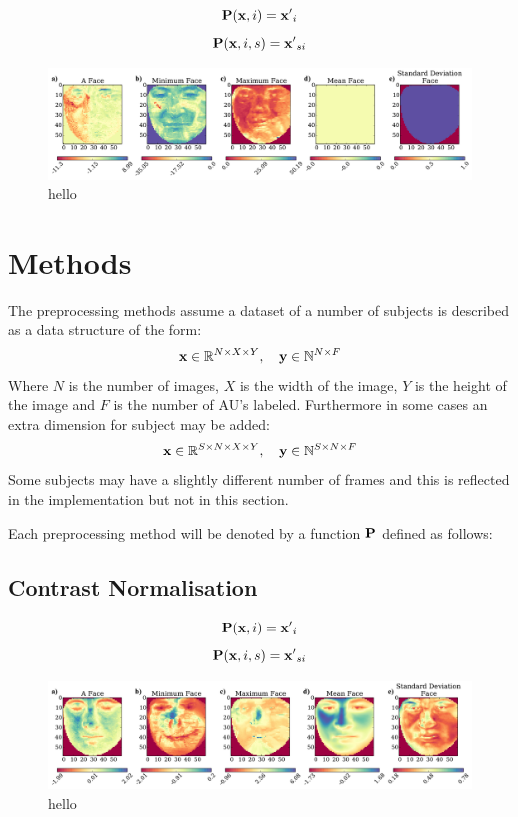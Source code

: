 \documentclass[11pt,twoside]{report}
\begin{document}
\begin{equation}
  {\bf P}({\bf x},i) = {\bf x'}_i
\end{equation}
\begin{equation}
  {\bf P}({\bf x},i,s) = {\bf x'}_{si}
\end{equation}
\begin{figure}[!h]
\centering
\includegraphics[width =\hsize]{figures/faces_per_subject_face.pdf}
\caption{hello}
\label{fig:simple}
\end{figure}

\section{Methods}
The preprocessing methods assume a dataset of a number of subjects
is described as a data structure of the form:
\begin{equation}
{\bf x} \in \mathbb{R}^{N\times X \times Y},\quad {\bf y} \in \mathbb{N}^{N\times F}
\end{equation}
Where $N$ is the number of images, $X$ is the width of the image, $Y$ is the height of the
image and $F$ is the number of AU's labeled. Furthermore in some cases an extra dimension
for subject may be added:
\begin{equation}
{\bf x} \in \mathbb{R}^{S\times N\times X \times Y},\quad {\bf y} \in \mathbb{N}^{S\times N\times F}
\end{equation}
Some subjects may have a slightly different number of frames and this is reflected
in the implementation but not in this section.

Each preprocessing method will be denoted by a function ${\bf P}$ defined as follows:


\subsection{Contrast Normalisation}

\begin{equation}
  {\bf P}({\bf x},i) = {\bf x'}_i
\end{equation}
\begin{equation}
  {\bf P}({\bf x},i,s) = {\bf x'}_{si}
\end{equation}
\begin{figure}[!h]
\centering
\includegraphics[width =\hsize]{figures/faces_contrast.pdf}
\caption{hello}
\label{fig:simple}
\end{figure}
\end{document}
